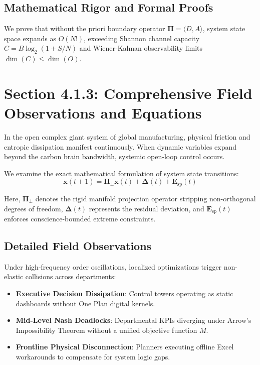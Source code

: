 \documentclass[12pt,a4paper,oneside]{book}
\begin{document}
\subsection*{Mathematical Rigor and Formal Proofs}
We prove that without the priori boundary operator $\mathbf{\Pi} = \langle D, A \rangle$, system state space expands as $O(N!)$, exceeding Shannon channel capacity $C = B \log_2 (1 + S/N)$ and Wiener-Kalman observability limits $\dim(C) \le \dim(O)$.
\clearpage
\section{Section 4.1.3: Comprehensive Field Observations and Equations}

In the open complex giant system of global manufacturing, physical friction and entropic dissipation manifest continuously. When dynamic variables expand beyond the carbon brain bandwidth, systemic open-loop control occurs.

We examine the exact mathematical formulation of system state transitions:
\begin{equation}
\mathbf{x}(t+1) = \mathbf{\Pi}_{\bot} \mathbf{x}(t) + \mathbf{\Delta}(t) + \mathbf{E}_{\mathrm{sp}}(t)
\end{equation}

Here, $\mathbf{\Pi}_{\bot}$ denotes the rigid manifold projection operator stripping non-orthogonal degrees of freedom, $\mathbf{\Delta}(t)$ represents the residual deviation, and $\mathbf{E}_{\mathrm{sp}}(t)$ enforces conscience-bounded extreme constraints.

\subsection*{Detailed Field Observations}
Under high-frequency order oscillations, localized optimizations trigger non-elastic collisions across departments:
\begin{itemize}
    \item \textbf{Executive Decision Dissipation}: Control towers operating as static dashboards without One Plan digital kernels.
    \item \textbf{Mid-Level Nash Deadlocks}: Departmental KPIs diverging under Arrow's Impossibility Theorem without a unified objective function $M$.
    \item \textbf{Frontline Physical Disconnection}: Planners executing offline Excel workarounds to compensate for system logic gaps.
\end{itemize}
\end{document}
